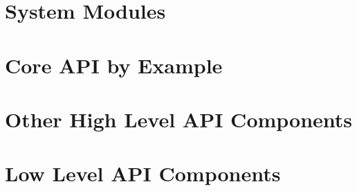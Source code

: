 
\section{System Modules}\label{sec:sysmod}

\section{Core API by Example}\label{sec:api-example}

\section{Other High Level API Components}\label{sec:api-high}

\section{Low Level API Components}\label{sec:api-low}


